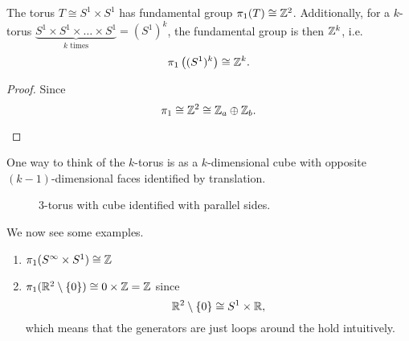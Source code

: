 \begin{corollary}
	The torus \(T\cong S^{1}\times S^1\) has fundamental group \(\pi _1(T)\cong \mathbb{\MakeUppercase{z}} ^2\). Additionally,
	for a \(k\)-torus \(\underbrace{S^{1}\times S^1 \times \ldots \times S^1}_{k\text{ times}} = (S^1)^k\), the fundamental group is then \(\mathbb{\MakeUppercase{z}} ^k\), i.e.
	\[
		\pi _1\left((S^1)^k\right) \cong \mathbb{\MakeUppercase{z}} ^k.
	\]
\end{corollary}
\begin{proof}
	Since
	\[
		\pi _1 \cong \mathbb{\MakeUppercase{z}}^2 \cong \mathbb{\MakeUppercase{z}} _a \oplus \mathbb{\MakeUppercase{z}} _b.
	\]
	\begin{figure}[H]
		\centering
		\label{fig:pf:torus-fundamental-group}
	\end{figure}
\end{proof}
\begin{remark}
	One way to think of the \(k\)-torus is as a \(k\)-dimensional cube with opposite \((k-1)\)-dimensional faces identified by translation.
	\begin{figure}[H]
		\centering
		\caption{\(3\)-torus with cube identified with parallel sides.}
		\label{fig:3-torus}
	\end{figure}
\end{remark}

\begin{eg}
	We now see some examples.
	\begin{enumerate}
		\item \(\pi _1(S^{\infty }\times S^1) \cong \mathbb{\MakeUppercase{z}} \)
		\item \(\pi _1(\mathbb{\MakeUppercase{r}} ^2\setminus \{0\}) \cong 0\times \mathbb{\MakeUppercase{z}} = \mathbb{\MakeUppercase{z}}\) since
		      \[
			      \mathbb{\MakeUppercase{r}} ^2\setminus \{0\}\cong S^{1}\times \mathbb{\MakeUppercase{r}},
		      \]
		      which means that the generators are just loops around the hold intuitively.
	\end{enumerate}
\end{eg}

